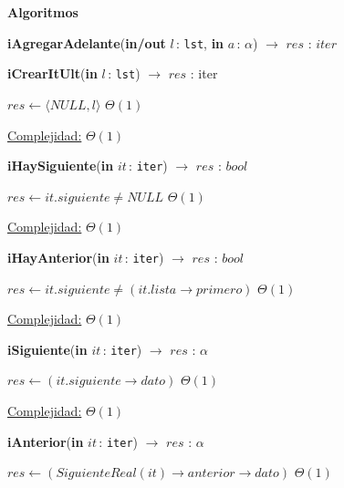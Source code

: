 \documentclass[a4paper,10pt]{article}
\let\TipoVariable=\texttt
\let\ModificadorArgumento=\textbf
\newcommand{\In}[2]{\ModificadorArgumento{in} \ensuremath{#1}\,: \TipoVariable{#2}\xspace}
\newcommand{\Inout}[2]{\ModificadorArgumento{in/out} \ensuremath{#1}\,: \TipoVariable{#2}\xspace}
\newenvironment{Algoritmos}{%
  \vspace*{2ex}%
  \noindent\textbf{\Large Algoritmos}%
  \vspace*{2ex}%
}{}
\begin{document}
\begin{Algoritmos}
\begin{







ithm}[H]{\textbf{iAgregarAdelante}(\Inout{l}{lst}, \In{a}{$\alpha$}) $\to$ $res$ : $iter$}
  
\begin{algorithm}[H]
	\begin{algorithmic}[1]
		\State \textbf{iCrearItUlt}(\In{l}{lst}) $\to$ $res$ : iter
		
			\State $res \gets \langle NULL, l \rangle$	\Comment $\Theta(1)$
    	
		\medskip
		\Statex \underline{Complejidad:} $\Theta(1)$
    \end{algorithmic}
\end{algorithm}	


\begin{algorithm}[H]
	\begin{algorithmic}[1]
		\State \textbf{iHaySiguiente}(\In{it}{iter}) $\to$ $res$ : $bool$
		
			\State $res \gets it.siguiente \neq NULL$	\Comment $\Theta(1)$

			\medskip
			\Statex \underline{Complejidad:} $\Theta(1)$
    	\end{algorithmic}
\end{algorithm}
	
	
\begin{algorithm}[H]	
	\begin{algorithmic}[1]
		\State \textbf{iHayAnterior}(\In{it}{iter}) $\to$ $res$ : $bool$
		
			\State $res \gets it.siguiente \neq (it.lista\rightarrow primero)$	\Comment $\Theta(1)$

			\medskip
			\Statex \underline{Complejidad:} $\Theta(1)$
    	\end{algorithmic}
\end{algorithm}
	
	
\begin{algorithm}[H]
	\begin{algorithmic}[1]
		\State \textbf{iSiguiente}(\In{it}{iter}) $\to$ $res$ : $\alpha$
		
			\State $res \gets (it.siguiente\rightarrow dato)$	\Comment $\Theta(1)$

			\medskip
			\Statex \underline{Complejidad:} $\Theta(1)$
    	\end{algorithmic}
\end{algorithm}
	
	
\begin{algorithm}[H]{\textbf{iAnterior}(\In{it}{iter}) $\to$ $res$ : $\alpha$}
	\begin{algorithmic}[1]	
			\State $res \gets (SiguienteReal(it)\rightarrow anterior\rightarrow dato)$	\Comment $\Theta(1)$


\end{algorithmic}
\end{algorithm}
\end{







ithm}
\end{Algoritmos}
\end{document}
